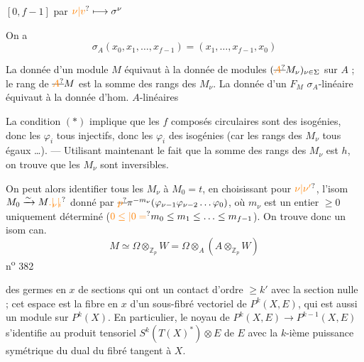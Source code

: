 \hfill $[0,f-1]$ par $\unsure{\nu|v}\longmapsto\sigma^\nu$

\hfill {}

On a
\[
\sigma_A(x_0,x_1,\ldots,x_{f-1})=(x_1,\ldots,x_{f-1},x_0)
\]

La donnée d'un module  $M$  équivaut à la donnée de modules $(\deleted{\unsure{A}}M_\nu)_{\nu\in\Sigma}$ sur $A$ ; le rang de $\deleted{\unsure{A}}M$ est la somme des rangs des $M_\nu$.  La donnée d'un  $F_M$ $\sigma_A$-linéaire équivaut à la donnée d'hom. $A$-linéaires

La condition $(*)$  implique que les $f$ composés circulaires sont des isogénies, donc les $\varphi_i$ tous injectifs, donc les $\varphi_i$ des isogénies (car les rangs des $M_\nu$ tous égaux \ldots).  --- Utilisant maintenant le fait que la somme des rangs des $M_\nu$ est $h$, on trouve que les $M_\nu$ sont inversibles.


On peut alors identifier tous les $M_\nu$ à   $M_0=t$,  en choisissant  pour  $\unsure{\nu|\nu'}$,
 l'isom $M_0\xrightarrow{\sim}M\unsure{.|\!{}_\nu|\!{}_{i}}$ donné par
$\deleted{\unsure{p}}\pi^{-m_\nu}(\varphi_{\nu-1}\varphi_{\nu-2}\ldots\varphi_0)$, où $m_\nu$ est un entier $\geq 0$ uniquement déterminé ($\unsure{0\leq|0=}m_0\leq m_1\leq\ldots\leq m_{f-1}$). On trouve donc un isom can.
\[
 M\simeq\Omega\otimes_{\mathbb Z_p} W=\Omega\otimes_A(A\otimes_{\mathbb Z_p}W)
\]
\hfill n\textsuperscript{o} 382

des germes en $x$ de sections qui ont un contact d'ordre $\geq k'$ avec la section nulle ; cet espace est la fibre en $x$ d'un sous-fibré vectoriel de $P^k(X,E)$, qui est aussi un module sur $P^k(X)$. En particulier, le noyau de $P^k(X,E)\longrightarrow P^{k-1}(X,E)$ s'identifie au produit tensoriel $S^k(T(X)^*)\otimes E$ de $E$ avec la $k$-ième puissance symétrique du dual du fibré tangent à $X$.


